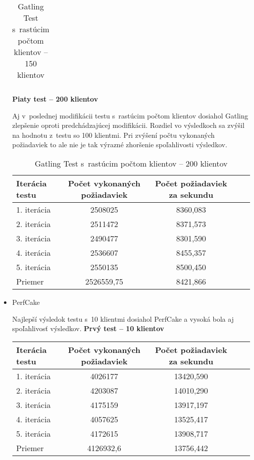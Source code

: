 \documentclass[12pt,oneside,final]{fithesis-utf8}
\begin{document}
\begin{itemize}
\begin{table}[H]
\begin{center}
\begin{tabular}{ | l | c | c | c | c |}
\end{tabular}
\end{center}
\caption{Gatling Test s~rastúcim počtom klientov -- 150 klientov}
\end{table}


\textbf{Piaty test -- 200 klientov}

Aj v~poslednej modifikácii testu s~rastúcim počtom klientov dosiahol Gatling zlepšenie oproti predchádzajúcej modifikácii. Rozdiel vo výsledkoch sa zvýšil na hodnotu z~testu so 100 klientmi. Pri zvýšení počtu vykonaných požiadaviek to ale nie je tak výrazné zhoršenie spoľahlivosti výsledkov.

\begin{table}[H]
\begin{center}
\begin{tabular}{ | l | c | c | c | c |}
		\hline
		 \textbf{Iterácia testu} & \textbf{Počet vykonaných požiadaviek} & \textbf{Počet požiadaviek za sekundu} \\ \hline
		 1. iterácia & 2508025 & 8360,083 \\ \hline
		 2. iterácia & 2511472 & 8371,573 \\ \hline
		 3. iterácia & 2490477 & 8301,590 \\ \hline
		 4. iterácia & 2536607 & 8455,357 \\ \hline
		 5. iterácia & 2550135 & 8500,450 \\ \hline
		 Priemer & 2526559,75 & 8421,866 \\ \hline
		 
\end{tabular}
\end{center}
\caption{Gatling Test s~rastúcim počtom klientov -- 200 klientov}
\end{table}


\item PerfCake

Najlepší výsledok testu s~10 klientmi dosiahol PerfCake a vysoká bola aj spoľahlivosť výsledkov.
\newpage
\textbf{Prvý test -- 10 klientov}
\begin{table}[H]
\begin{center}
\begin{tabular}{ | l | c | c | c | c |}
		\hline
		 \textbf{Iterácia testu} & \textbf{Počet vykonaných požiadaviek} & \textbf{Počet požiadaviek za sekundu} \\ \hline
		 1. iterácia & 4026177 & 13420,590 \\ \hline
		 2. iterácia & 4203087 & 14010,290 \\ \hline
		 3. iterácia & 4175159 & 13917,197 \\ \hline
		 4. iterácia & 4057625 & 13525,417 \\ \hline
		 5. iterácia & 4172615 & 13908,717 \\ \hline
		 Priemer & 4126932,6 & 13756,442 \\ \hline
		 

\end{tabular}
\end{center}
\end{table}
\end{itemize}
\end{document}
